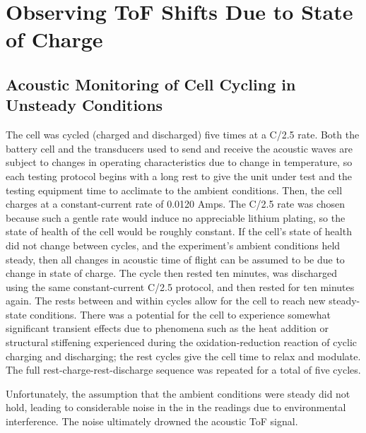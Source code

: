 \section{Observing ToF Shifts Due to State of Charge}

\subsection{Acoustic Monitoring of Cell Cycling in Unsteady Conditions}

The cell was cycled (charged and discharged) five times at a C/2.5 rate. 
Both the battery cell and the transducers used to send and receive the acoustic waves are subject to changes in operating characteristics due to change in temperature, so each testing protocol begins with a long rest to give the unit under test and the testing equipment time to acclimate to the ambient conditions. 
Then, the cell charges at a constant-current rate of 0.0120 Amps. 
The C/2.5 rate was chosen because such a gentle rate would induce no appreciable lithium plating, so the state of health of the cell would be roughly constant. 
If the cell's state of health did not change between cycles, and the experiment's ambient conditions held steady, then all changes in acoustic time of flight can be assumed to be due to change in state of charge.
The cycle then rested ten minutes, was discharged using the same constant-current C/2.5 protocol, and then rested for ten minutes again. 
The rests between and within cycles allow for the cell to reach new steady-state conditions. 
There was a potential for the cell to experience somewhat significant transient effects due to phenomena such as the heat addition or structural stiffening experienced during the oxidation-reduction reaction of cyclic charging and discharging; the rest cycles give the cell time to relax and modulate.
The full rest-charge-rest-discharge sequence was repeated for a total of five cycles.

Unfortunately, the assumption that the ambient conditions were steady did not hold, leading to considerable noise in the in the readings due to environmental interference. The noise ultimately drowned the acoustic ToF signal.

